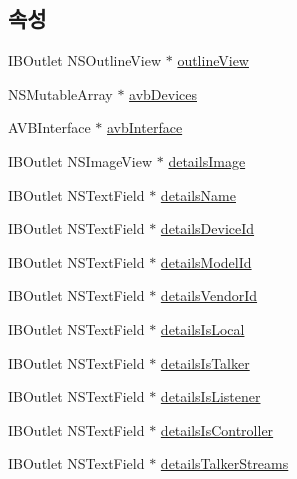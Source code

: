 \subsection*{속성}
\begin{DoxyCompactItemize}
\item 
I\+B\+Outlet N\+S\+Outline\+View $\ast$ \hyperlink{interface_outline_view_controller_a2df5f78f79ebb8f68653c3b54304e6e8}{outline\+View}
\item 
N\+S\+Mutable\+Array $\ast$ \hyperlink{interface_outline_view_controller_a20a915915c748191825c263c1e590e10}{avb\+Devices}
\item 
A\+V\+B\+Interface $\ast$ \hyperlink{interface_outline_view_controller_aa2eb2773d9828983a52f0c3d23170b8a}{avb\+Interface}
\item 
I\+B\+Outlet N\+S\+Image\+View $\ast$ \hyperlink{interface_outline_view_controller_a39e8e2bf1c9771ad4df7ca12b2fc44bd}{details\+Image}
\item 
I\+B\+Outlet N\+S\+Text\+Field $\ast$ \hyperlink{interface_outline_view_controller_a7a9756ea9cb4e3a8b300d1906e020ec3}{details\+Name}
\item 
I\+B\+Outlet N\+S\+Text\+Field $\ast$ \hyperlink{interface_outline_view_controller_ac80161778b5979fffdc02a7de71bf762}{details\+Device\+Id}
\item 
I\+B\+Outlet N\+S\+Text\+Field $\ast$ \hyperlink{interface_outline_view_controller_a0d0fd477fde079e7e594bd8576ba10fd}{details\+Model\+Id}
\item 
I\+B\+Outlet N\+S\+Text\+Field $\ast$ \hyperlink{interface_outline_view_controller_a05fc46c77c4ab0a7c0d67420f4a97fe4}{details\+Vendor\+Id}
\item 
I\+B\+Outlet N\+S\+Text\+Field $\ast$ \hyperlink{interface_outline_view_controller_a4ecd1fb010b36933aca363f1bc2cddf8}{details\+Is\+Local}
\item 
I\+B\+Outlet N\+S\+Text\+Field $\ast$ \hyperlink{interface_outline_view_controller_a65c0b4ab07c845325e04a290e594d26f}{details\+Is\+Talker}
\item 
I\+B\+Outlet N\+S\+Text\+Field $\ast$ \hyperlink{interface_outline_view_controller_a627aa74cdaf3b30d128506a71f0ab370}{details\+Is\+Listener}
\item 
I\+B\+Outlet N\+S\+Text\+Field $\ast$ \hyperlink{interface_outline_view_controller_abdb488283412f83c5cde219dda7cc543}{details\+Is\+Controller}
\item 
I\+B\+Outlet N\+S\+Text\+Field $\ast$ \hyperlink{interface_outline_view_controller_a070a2c6cab3e46934349fe45fbf40926}{details\+Talker\+Streams}

\end{DoxyCompactItemize}
